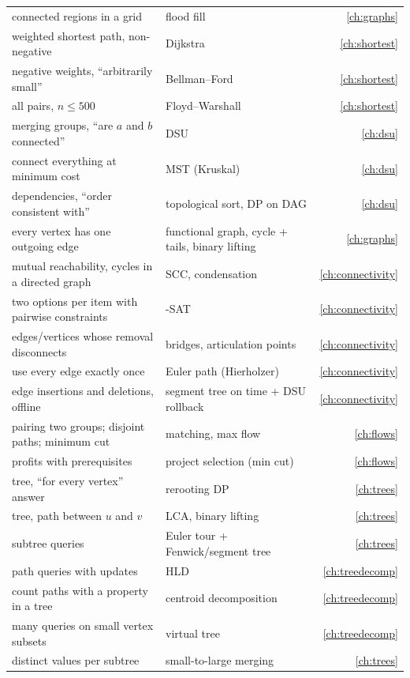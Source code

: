 \begin{small}
\begin{longtable}{>{\raggedright\arraybackslash}p{6.4cm}>{\raggedright\arraybackslash}p{6.3cm}r}
connected regions in a grid & flood fill & \ref{ch:graphs} \\
weighted shortest path, non-negative & Dijkstra & \ref{ch:shortest} \\
negative weights, ``arbitrarily small'' & Bellman--Ford & \ref{ch:shortest} \\
all pairs, $n \le 500$ & Floyd--Warshall & \ref{ch:shortest} \\
merging groups, ``are $a$ and $b$ connected'' & DSU & \ref{ch:dsu} \\
connect everything at minimum cost & MST (Kruskal) & \ref{ch:dsu} \\
dependencies, ``order consistent with'' & topological sort, DP on DAG & \ref{ch:dsu} \\
every vertex has one outgoing edge & functional graph, cycle + tails, binary lifting & \ref{ch:graphs} \\
mutual reachability, cycles in a directed graph & SCC, condensation & \ref{ch:connectivity} \\
two options per item with pairwise constraints & 2-SAT & \ref{ch:connectivity} \\
edges/vertices whose removal disconnects & bridges, articulation points & \ref{ch:connectivity} \\
use every edge exactly once & Euler path (Hierholzer) & \ref{ch:connectivity} \\
edge insertions and deletions, offline & segment tree on time + DSU rollback & \ref{ch:connectivity} \\
pairing two groups; disjoint paths; minimum cut & matching, max flow & \ref{ch:flows} \\
profits with prerequisites & project selection (min cut) & \ref{ch:flows} \\
tree, ``for every vertex'' answer & rerooting DP & \ref{ch:trees} \\
tree, path between $u$ and $v$ & LCA, binary lifting & \ref{ch:trees} \\
subtree queries & Euler tour + Fenwick/segment tree & \ref{ch:trees} \\
path queries with updates & HLD & \ref{ch:treedecomp} \\
count paths with a property in a tree & centroid decomposition & \ref{ch:treedecomp} \\
many queries on small vertex subsets & virtual tree & \ref{ch:treedecomp} \\
distinct values per subtree & small-to-large merging & \ref{ch:trees} \\

\end{longtable}
\end{small}

